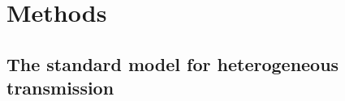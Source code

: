 \documentclass{imammb}
\numberwithin{equation}{section}
\begin{document}



\section{Methods}

\subsection{The standard model for heterogeneous transmission}

\end{document}
